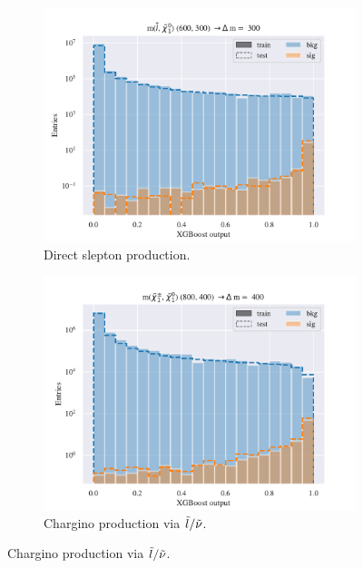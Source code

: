 \begin{figure}[H]
    \centering
    \begin{subfigure}[t!]{0.49\textwidth}
        \includegraphics[width = \textwidth]{Figures/SlepSlep/ML/BDT/High_level/Inter/scaled_train_test_396014.pdf}
        \caption{Direct slepton production.}
        \label{fig:}
    \end{subfigure}
    \begin{subfigure}[t!]{0.49\textwidth}
        \includegraphics[width = \textwidth]{Figures/SlepSnu/BDT/High_level/Inter/scaled_train_test_397150.pdf}
        \caption{Chargino production via $\Tilde{l}/\Tilde{\nu}$.}
        \label{fig:}
    \end{subfigure}

\end{figure}
